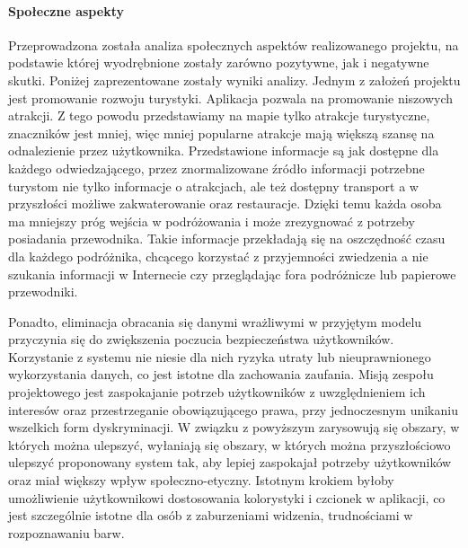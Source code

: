 \paragraph*{Społeczne aspekty}
\newline \indent Przeprowadzona została analiza społecznych aspektów realizowanego projektu, na podstawie której wyodrębnione zostały zarówno pozytywne, jak i negatywne skutki. Poniżej zaprezentowane zostały wyniki analizy.
\newline \indent Jednym z założeń projektu jest promowanie rozwoju turystyki. Aplikacja pozwala na promowanie niszowych atrakcji.
Z tego powodu przedstawiamy na mapie tylko atrakcje turystyczne, znaczników jest mniej, więc mniej popularne atrakcje mają większą szansę na odnalezienie przez użytkownika.
\newline \indent Przedstawione informacje są jak dostępne dla każdego odwiedzającego, przez znormalizowane źródło informacji potrzebne turystom nie tylko informacje o atrakcjach, ale też dostępny transport a w przyszłości  możliwe zakwaterowanie oraz restauracje.
Dzięki temu każda osoba ma mniejszy próg wejścia w podróżowania i może zrezygnować z potrzeby posiadania przewodnika.
Takie informacje przekładają się na oszczędność czasu dla każdego podróżnika, chcącego korzystać z przyjemności zwiedzenia a nie szukania informacji w Internecie czy przeglądając fora podróżnicze lub papierowe przewodniki.


\newline \indent Ponadto, eliminacja obracania się danymi wrażliwymi w przyjętym modelu przyczynia się do zwiększenia poczucia bezpieczeństwa użytkowników. Korzystanie z systemu nie niesie dla nich ryzyka utraty lub nieuprawnionego wykorzystania danych, co jest istotne dla zachowania zaufania. Misją zespołu projektowego jest zaspokajanie potrzeb użytkowników z uwzględnieniem ich interesów oraz przestrzeganie obowiązującego prawa, przy jednoczesnym unikaniu wszelkich form dyskryminacji.
W związku z powyższym zarysowują się obszary, w których można ulepszyć, wyłaniają się obszary, w których można przyszłościowo ulepszyć proponowany system tak, aby lepiej zaspokajał potrzeby użytkowników oraz miał większy wpływ społeczno-etyczny. Istotnym krokiem byłoby umożliwienie użytkownikowi dostosowania kolorystyki i czcionek w aplikacji, co jest szczególnie istotne dla osób z zaburzeniami widzenia, trudnościami w rozpoznawaniu barw.

